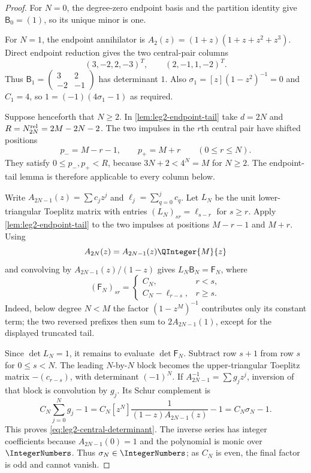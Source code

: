 \begin{proof}
For $N=0$, the degree-zero endpoint basis and the partition identity give
$\mathsf B_0=(1)$, so its unique minor is one.

For $N=1$, the endpoint annihilator is
$A_2(z)=(1+z)(1+z+z^2+z^3)$.  Direct endpoint reduction gives the two
central-pair columns
\[
 (3,-2,2,-3)^T,\qquad (2,-1,1,-2)^T.
\]
Thus
$\mathsf B_1=\left(\begin{smallmatrix}3&2\\-2&-1\end{smallmatrix}\right)$
has determinant $1$.  Also
$\sigma_1=[z](1-z^2)^{-1}=0$ and $C_1=4$, so
$1=(-1)(4\sigma_1-1)$ as required.

Suppose henceforth that $N\ge2$.  In
\cref{lem:leg2-endpoint-tail} take $d=2N$ and
$R=N_{2N}^{\rm rel}=2M-2N-2$.  The two impulses in the $r$th central pair
have shifted positions
\[
 p_-=M-r-1,\qquad p_+=M+r \qquad(0\le r\le N).
\]
They satisfy $0\le p_-,p_+<R$, because
$3N+2<4^N=M$ for $N\ge2$.  The endpoint-tail lemma is therefore applicable
to every column below.

Write $A_{2N-1}(z)=\sum c_jz^j$ and
$\ell_j=\sum_{q=0}^{j}c_q$.  Let $L_N$ be the unit lower-triangular Toeplitz
matrix with entries $(L_N)_{sr}=\ell_{s-r}$ for $s\ge r$.  Apply
\cref{lem:leg2-endpoint-tail} to the two impulses at positions
$M-r-1$ and $M+r$.  Using
\[
 A_{2N}(z)=A_{2N-1}(z)\QInteger{M}{z}
\]
and convolving by $A_{2N-1}(z)/(1-z)$ gives
$L_N\mathsf B_N=\mathsf F_N$, where
\begin{equation}
 (\mathsf F_N)_{sr}=
 \begin{cases}
 C_N,&r<s,\\
 C_N-\ell_{r-s},&r\ge s.
 \end{cases}
 \label{eq:leg2-F-matrix}
\end{equation}
Indeed, below degree $N<M$ the factor $(1-z^M)^{-1}$ contributes only its
constant term; the two reversed prefixes then sum to
$2A_{2N-1}(1)$, except for the displayed truncated tail.

Since $\det L_N=1$, it remains to evaluate $\det\mathsf F_N$.  Subtract row
$s+1$ from row $s$ for $0\le s<N$.  The leading $N$-by-$N$ block becomes the
upper-triangular Toeplitz matrix $-(c_{r-s})$, with determinant $(-1)^N$.
If $A_{2N-1}^{-1}=\sum g_jz^j$, inversion of that block is
convolution by $g_j$.  Its Schur complement is
\[
 C_N\sum_{j=0}^{N}g_j-1
 =C_N[z^N]\frac1{(1-z)A_{2N-1}(z)}-1
 =C_N\sigma_N-1.
\]
This proves \eqref{eq:leg2-central-determinant}.  The inverse series has
integer coefficients because $A_{2N-1}(0)=1$ and the polynomial is
monic over $\IntegerNumbers$.  Thus $\sigma_N\in\IntegerNumbers$; as $C_N$ is even, the final factor is
odd and cannot vanish.
\end{proof}

